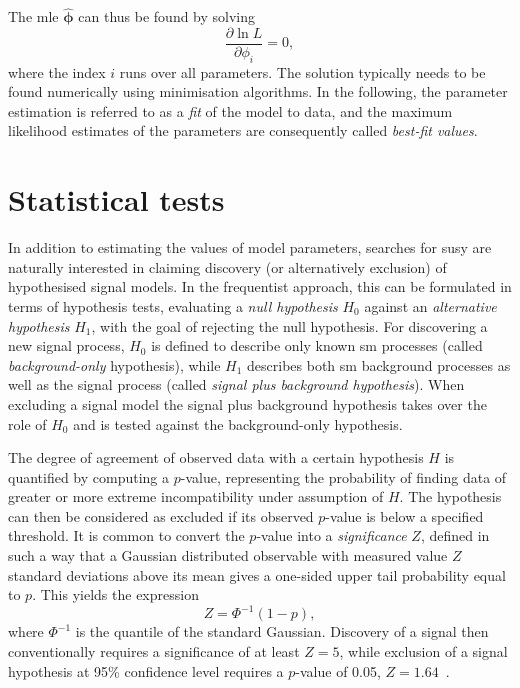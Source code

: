 The \gls{mle} $\boldsymbol{\hat{\phi}}$ can thus be found by solving
\begin{equation}
 \frac{\partial \ln L}{\partial\phi_i} = 0,
\end{equation}
where the index $i$ runs over all parameters. The solution typically needs to be found numerically using minimisation algorithms. In the following, the parameter estimation is referred to as a \textit{fit} of the model to data, and the maximum likelihood estimates of the parameters are consequently called \textit{best-fit values}.

\section{Statistical tests}

In addition to estimating the values of model parameters, searches for \gls{susy} are naturally interested in claiming discovery (or alternatively exclusion) of hypothesised signal models. In the frequentist approach, this can be formulated in terms of hypothesis tests, evaluating a \textit{null hypothesis} $H_0$ against an \textit{alternative hypothesis} $H_1$, with the goal of rejecting the null hypothesis. For discovering a new signal process, $H_0$ is defined to describe only known \gls{sm} processes (called \textit{background-only} hypothesis), while $H_1$ describes both \gls{sm} background processes as well as the signal process (called \textit{signal plus background hypothesis}). When excluding a signal model the signal plus background hypothesis takes over the role of $H_0$ and is tested against the background-only hypothesis.

The degree of agreement of observed data with a certain hypothesis $H$ is quantified by computing a $p$-value, representing the probability of finding data of greater or more extreme incompatibility under assumption of $H$. The hypothesis can then be considered as excluded if its observed $p$-value is below a specified threshold. It is common to convert the $p$-value into a \textit{significance} $Z$, defined in such a way that a Gaussian distributed observable with measured value $Z$ standard deviations above its mean gives a one-sided upper tail probability equal to $p$. This yields the expression
\begin{equation}
	Z = \Phi^{-1}(1-p),
	\label{eq:significance}
\end{equation}
where $\Phi^{-1}$ is the quantile of the standard Gaussian. Discovery of a signal then conventionally requires a significance of at least $Z = 5$, while exclusion of a signal hypothesis at 95\% confidence level requires a $p$-value of 0.05, \ie $Z = 1.64$~\cite{Cowan:2010js}. 

